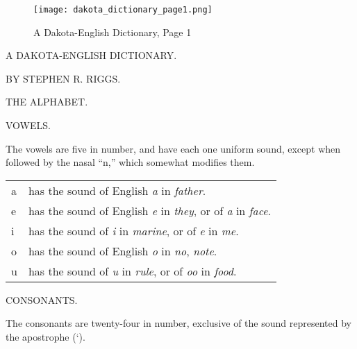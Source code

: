 \documentclass{article}
\begin{document}
\begin{figure}[htbp]
\centering
\texttt{[image: dakota\_dictionary\_page1.png]} %
\caption{A Dakota-English Dictionary, Page 1}
\label{fig:page1}
\end{figure}

\noindent
A DAKOTA-ENGLISH DICTIONARY.

\noindent
BY STEPHEN R. RIGGS.

\vspace{0.5cm}
\noindent
THE ALPHABET.

\vspace{0.5cm}
\noindent
\textsc{VOWELS.}

\noindent
The vowels are five in number, and have each one uniform sound, except when followed by the nasal ``n,'' which somewhat modifies them.

\begin{tabular}{ll}
    a & has the sound of English \textit{a} in \textit{father}.\\
    e & has the sound of English \textit{e} in \textit{they}, or of \textit{a} in \textit{face}.\\
    i & has the sound of \textit{i} in \textit{marine}, or of \textit{e} in \textit{me}.\\
    o & has the sound of English \textit{o} in \textit{no}, \textit{note}.\\
    u & has the sound of \textit{u} in \textit{rule}, or of \textit{oo} in \textit{food}.
\end{tabular}

\vspace{0.5cm}
\noindent
\textsc{CONSONANTS.}

\noindent
The consonants are twenty-four in number, exclusive of the sound represented by the apostrophe (‘).
\end{document}
